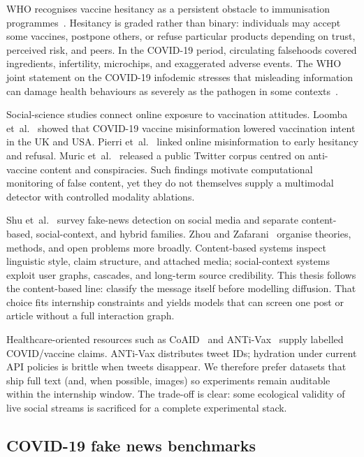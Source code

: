 \documentclass[12pt, a4paper]{report}
\begin{document}
WHO recognises vaccine hesitancy as a persistent obstacle to immunisation programmes~\cite{macdonald2015hesitancy}.
Hesitancy is graded rather than binary: individuals may accept some vaccines, postpone others, or refuse particular products depending on trust, perceived risk, and peers.
In the COVID-19 period, circulating falsehoods covered ingredients, infertility, microchips, and exaggerated adverse events.
The WHO joint statement on the COVID-19 infodemic stresses that misleading information can damage health behaviours as severely as the pathogen in some contexts~\cite{who2020infodemic}.

Social-science studies connect online exposure to vaccination attitudes.
Loomba et~al.~\cite{loomba2021measuring} showed that COVID-19 vaccine misinformation lowered vaccination intent in the UK and USA.
Pierri et~al.~\cite{pierri2022online} linked online misinformation to early hesitancy and refusal.
Muric et~al.~\cite{muric2021covid} released a public Twitter corpus centred on anti-vaccine content and conspiracies.
Such findings motivate computational monitoring of false content, yet they do not themselves supply a multimodal detector with controlled modality ablations.

Shu et~al.~\cite{shu2017fake} survey fake-news detection on social media and separate content-based, social-context, and hybrid families.
Zhou and Zafarani~\cite{zhou2020survey} organise theories, methods, and open problems more broadly.
Content-based systems inspect linguistic style, claim structure, and attached media; social-context systems exploit user graphs, cascades, and long-term source credibility.
This thesis follows the content-based line: classify the message itself before modelling diffusion.
That choice fits internship constraints and yields models that can screen one post or article without a full interaction graph.

Healthcare-oriented resources such as CoAID~\cite{cui2020coaid} and ANTi-Vax~\cite{hayawi2022antivax} supply labelled COVID/vaccine claims.
ANTi-Vax distributes tweet IDs; hydration under current API policies is brittle when tweets disappear.
We therefore prefer datasets that ship full text (and, when possible, images) so experiments remain auditable within the internship window.
The trade-off is clear: some ecological validity of live social streams is sacrificed for a complete experimental stack.

\subsection{COVID-19 fake news benchmarks}
\end{document}
